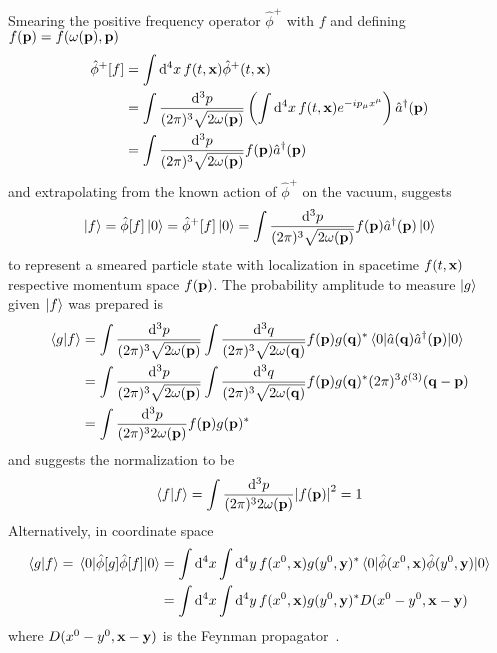 Smearing the positive frequency operator $\hat\phi^+$  with $f$ and defining $f(\vb{p})=f(\omega(\vb{p}),\vb{p})$
\begin{align}
	\hat\phi^+[f]
	&=
	\int\dd[4]{x}
	f(t,\vb{x})
	\hat\phi^+(t,\vb{x})
	\\
	&=
	\int\frac{\dd[3]{p}}{(2\pi)^3\sqrt{2\omega(\vb{p})}}
	\left(
		\int\dd[4]{x}
		f(t,\vb{x})
		e^{-ip_\mu x^\mu}
	\right)
	\hat{a}^\dagger(\vb{p})
	\\
	&=
	\int\frac{\dd[3]{p}}{(2\pi)^3\sqrt{2\omega(\vb{p})}}
	f(\vb{p})
	\hat{a}^\dagger(\vb{p})
\end{align}
and extrapolating from the known action of $\hat\phi^+$ on the vacuum, suggests
\begin{equation}
	\ket{f}
	=
	\hat\phi[f]\ket{0}
	=
	\hat\phi^+[f]\ket{0}
	=
	\int\frac{\dd[3]{p}}{(2\pi)^3\sqrt{2\omega(\vb{p})}}
	f(\vb{p})\hat{a}^\dagger(\vb{p})\ket{0}
\end{equation}
to represent a smeared particle state with localization in spacetime $f(t,\vb{x})$ respective momentum space $f(\vb{p})$.
The probability amplitude to measure $\ket{g}$ given $\ket{f}$ was prepared is
\begin{equation}
	\begin{split}
		\bra{g}\ket{f}
		&=
		\int\frac{\dd[3]{p}}{(2\pi)^3\sqrt{2\omega(\vb{p})}}
		\int\frac{\dd[3]{q}}{(2\pi)^3\sqrt{2\omega(\vb{q})}}
		f(\vb{p})g(\vb{q})^*
		\expval{\hat{a}(\vb{q})\hat{a}^\dagger(\vb{p})}{0}
		\\
		&=
		\int\frac{\dd[3]{p}}{(2\pi)^3\sqrt{2\omega(\vb{p})}}
		\int\frac{\dd[3]{q}}{(2\pi)^3\sqrt{2\omega(\vb{q})}}
		f(\vb{p})g(\vb{q})^*
		(2\pi)^3\delta^{(3)}(\vb{q}-\vb{p})
		\\
		&=
		\int\frac{\dd[3]{p}}{(2\pi)^32\omega(\vb{p})}
		f(\vb{p})g(\vb{p})^*
	\end{split}
\end{equation}
and suggests the normalization to be
\begin{equation}
	\bra{f}\ket{f}
	=
	\int\frac{\dd[3]{p}}{(2\pi)^32\omega(\vb{p})}
	\abs{f(\vb{p})}^2
	=
	1
\end{equation}
Alternatively, in coordinate space
\begin{equation}
	\begin{split}
		\bra{g}\ket{f}
		=
		\expval{\hat\phi[g]\hat\phi[f]}{0}
		&=
		\int\dd[4]{x}
		\int\dd[4]{y}
		f(x^0,\vb{x})g(y^0,\vb{y})^*
		\expval{\hat\phi(x^0,\vb{x})\hat\phi(y^0,\vb{y})}{0}
		\\
		&=
		\int\dd[4]{x}
		\int\dd[4]{y}
		f(x^0,\vb{x})g(y^0,\vb{y})^*
		D(x^0-y^0,\vb{x}-\vb{y})
	\end{split}
\end{equation}
where $D(x^0-y^0,\vb{x}-\vb{y})$ is the Feynman propagator~\cite[p.~27]{Peskin1995}.


